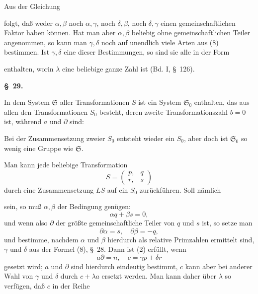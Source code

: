 
Aus der Gleichung


folgt, daß weder $\alpha, \beta$ noch $\alpha, \gamma$, noch $\delta, \beta$, noch $\delta, \gamma$ einen gemeinschaftlichen Faktor haben können. Hat man aber $\alpha, \beta$ beliebig ohne gemeinschaftlichen Teiler angenommen, so kann man $\gamma, \delta$ noch auf unendlich viele Arten aus (8) bestimmen. Ist $\gamma, \delta$ eine dieser Bestimmungen, so sind sie alle in der Form


enthalten, worin $\lambda$ eine beliebige ganze Zahl ist (Bd. I, \S\ 126).

\begin{center}
\textbf{\S\ 29.\quad{}}
\end{center}

In dem System $\mathfrak{S}$ aller Transformationen $S$ ist ein System $\mathfrak{S}_0$ enthalten, das aus allen den Transformationen $S_0$ besteht, deren zweite Transformationszahl $b = 0$ ist, während $a$ und $\partial$  sind:


Bei der Zusammensetzung zweier $S_0$ entsteht wieder ein $S_0$, aber doch ist $\mathfrak{S}_0$ so wenig eine Gruppe wie $\mathfrak{S}$.

Man kann jede beliebige Transformation
\[
S = \begin{pmatrix} p, & q \\ r, & s \end{pmatrix}
\]
durch eine Zusammensetzung $LS$ auf ein $S_0$ zurückführen. Soll nämlich


sein, so muß $\alpha, \beta$ der Bedingung genügen:
\[
\alpha q + \beta s = 0,
\]
und wenn also $\partial$ der größte gemeinschaftliche Teiler von $q$ und $s$ ist, so setze man
\[
\partial\alpha = s, \quad \partial\beta = -q,
\]
und bestimme, nachdem $\alpha$ und $\beta$ hierdurch als relative Primzahlen ermittelt sind, $\gamma$ und $\delta$ aus der Formel (8), \S\ 28. Dann ist (2) erfüllt, wenn
\[
a\partial = n, \quad c = \gamma p + \delta r
\]
gesetzt wird; $a$ und $\partial$ sind hierdurch eindeutig bestimmt, $c$ kann aber bei anderer Wahl von $\gamma$ und $\delta$ durch $c+\lambda a$ ersetzt werden. Man kann daher über $\lambda$ so verfügen, daß $c$ in der Reihe
